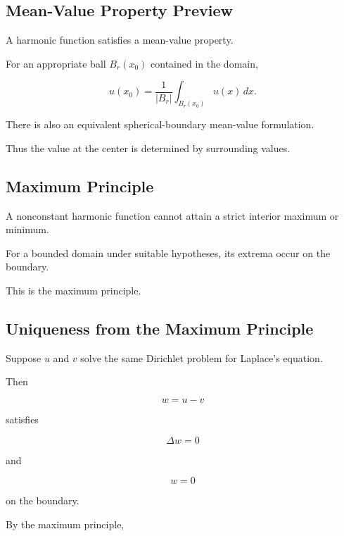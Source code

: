 \subsection{Mean-Value Property Preview}
\label{subsec:harmonic-mean-value-property}

A harmonic function satisfies a mean-value property.

For an appropriate ball \(B_r(x_0)\) contained in the domain,

\[
\boxed{
u(x_0)
=
\frac1{
|B_r|
}
\int_{B_r(x_0)}
u(x)\,dx.
}
\]

There is also an equivalent spherical-boundary mean-value formulation.

Thus the value at the center is determined by surrounding values.

\subsection{Maximum Principle}
\label{subsec:maximum-principle}

A nonconstant harmonic function cannot attain a strict interior maximum
or minimum.

For a bounded domain under suitable hypotheses, its extrema occur on the
boundary.

This is the maximum principle.

\subsection{Uniqueness from the Maximum Principle}
\label{subsec:laplace-uniqueness-maximum-principle}

Suppose \(u\) and \(v\) solve the same Dirichlet problem for Laplace's
equation.

Then

\[
w=u-v
\]

satisfies

\[
\Delta w=0
\]

and

\[
w=0
\]

on the boundary.

By the maximum principle,

